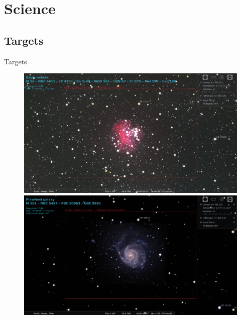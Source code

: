 \documentclass[11pt, aspectratio=169]{beamer}
\begin{document}
\section{Science}
\subsection{Targets}
\begin{frame}{Targets}
\vspace{-0.27cm}
\begin{figure}[!htb]
    \begin{minipage}[t]{.42\textwidth}
        \centering
        \includegraphics[width=\linewidth]{figures/targets/Eagle.png}
    \end{minipage}%
	\begin{minipage}[t]{.42\textwidth}
        \centering
        \includegraphics[width=\linewidth]{figures/targets/Pinwheel.png}
    \end{minipage}%
	\vspace{-0.02cm}  
    \begin{minipage}[t]{.42\textwidth}
        \centering

\end{minipage}
\end{figure}
\end{frame}
\end{document}
